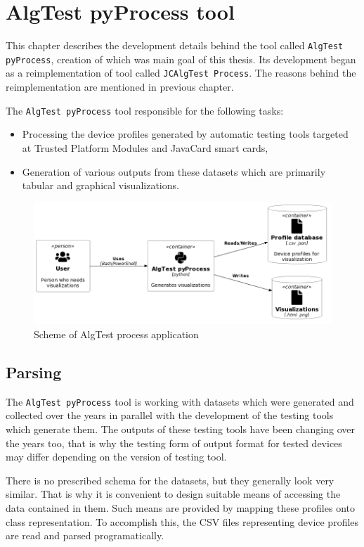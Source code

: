 \chapter{AlgTest pyProcess tool}
This chapter describes the development details behind the tool called \texttt{AlgTest pyProcess}, creation of which was main goal of this thesis. Its development began as a reimplementation of tool called \texttt{JCAlgTest Process}. The reasons behind the reimplementation are mentioned in previous chapter.

The \texttt{AlgTest pyProcess} tool responsible for the following tasks:
\begin{itemize}
    \item Processing the device profiles generated by automatic testing tools targeted at Trusted Platform Modules and JavaCard smart cards,
    \item Generation of various outputs from these datasets which are primarily tabular and graphical visualizations.
\end{itemize}
\begin{figure}[h]
    \centering
    \includegraphics[width=\textwidth]{img/scheme.png}
    \caption{Scheme of AlgTest process application}
    \label{fig:algtest-process-scheme}
\end{figure}


\section{Parsing}
The \texttt{AlgTest pyProcess} tool is working with datasets which were generated and collected over the years in parallel with the development of the testing tools which generate them. The outputs of these testing tools have been changing over the years too, that is why the testing form of output format for tested devices may differ depending on the version of testing tool.

There is no prescribed schema for the datasets, but they generally look very similar. That is why it is convenient to design suitable means of accessing the data contained in them. Such means are provided by mapping these profiles onto class representation. To accomplish this, the CSV files representing device profiles are read and parsed programatically.

